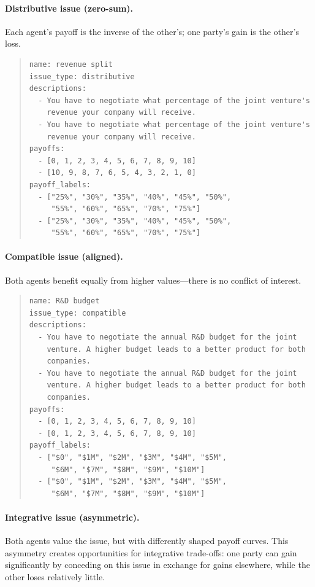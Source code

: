 \documentclass[12pt,a4paper]{article}
\begin{document}
\paragraph{Distributive issue (zero-sum).}
Each agent's payoff is the inverse of the other's; one party's gain is the other's loss.

\begin{quote}
\small
\begin{verbatim}
name: revenue split
issue_type: distributive
descriptions:
  - You have to negotiate what percentage of the joint venture's
    revenue your company will receive.
  - You have to negotiate what percentage of the joint venture's
    revenue your company will receive.
payoffs:
  - [0, 1, 2, 3, 4, 5, 6, 7, 8, 9, 10]
  - [10, 9, 8, 7, 6, 5, 4, 3, 2, 1, 0]
payoff_labels:
  - ["25%", "30%", "35%", "40%", "45%", "50%",
     "55%", "60%", "65%", "70%", "75%"]
  - ["25%", "30%", "35%", "40%", "45%", "50%",
     "55%", "60%", "65%", "70%", "75%"]
\end{verbatim}
\end{quote}

\paragraph{Compatible issue (aligned).}
Both agents benefit equally from higher values---there is no conflict of interest.

\begin{quote}
\small
\begin{verbatim}
name: R&D budget
issue_type: compatible
descriptions:
  - You have to negotiate the annual R&D budget for the joint
    venture. A higher budget leads to a better product for both
    companies.
  - You have to negotiate the annual R&D budget for the joint
    venture. A higher budget leads to a better product for both
    companies.
payoffs:
  - [0, 1, 2, 3, 4, 5, 6, 7, 8, 9, 10]
  - [0, 1, 2, 3, 4, 5, 6, 7, 8, 9, 10]
payoff_labels:
  - ["$0", "$1M", "$2M", "$3M", "$4M", "$5M",
     "$6M", "$7M", "$8M", "$9M", "$10M"]
  - ["$0", "$1M", "$2M", "$3M", "$4M", "$5M",
     "$6M", "$7M", "$8M", "$9M", "$10M"]
\end{verbatim}
\end{quote}

\paragraph{Integrative issue (asymmetric).}
Both agents value the issue, but with differently shaped payoff curves. This asymmetry creates opportunities for integrative trade-offs: one party can gain significantly by conceding on this issue in exchange for gains elsewhere, while the other loses relatively little.
\end{document}
